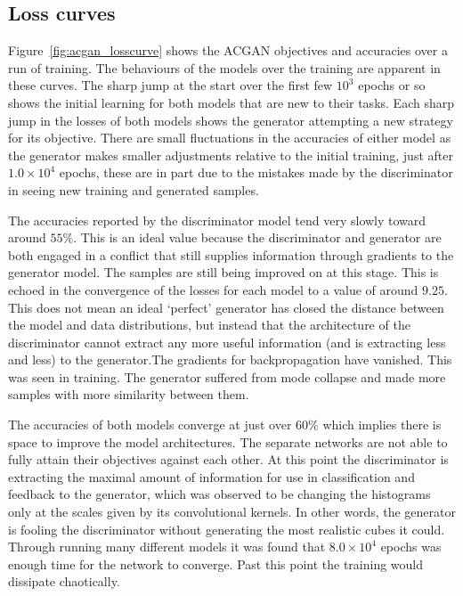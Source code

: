 \documentclass[twocolumn]{article}
\numberwithin{equation}{section}
\begin{document}
\subsection{Loss curves}

Figure~\ref{fig:acgan_losscurve} shows the ACGAN objectives and accuracies over a run of training. The behaviours of the 
models over the training are apparent in these curves. The sharp jump at the start over the first few $10^3$ epochs or so 
shows the initial learning for both models that are new to their tasks. Each sharp jump in the losses of both models shows
the  generator attempting a new strategy for its objective. There are small fluctuations in the accuracies of either model 
as the generator makes smaller adjustments relative to the initial training, just after $1.0\times10^4$ epochs, these are 
in part due to the mistakes made by the discriminator in seeing new training and generated samples.

The accuracies reported by the discriminator model tend very slowly toward around $55\%$. This is an ideal value because the
discriminator and generator are both engaged in a conflict that still supplies information through gradients to the generator
model. The samples are still being improved on at this stage. This is echoed in the convergence of the losses for each model 
to a value of around $9.25$. 
This does not mean an ideal `perfect' generator has closed the distance between the model and data distributions, but instead 
that the architecture of the discriminator cannot extract any more useful information (and is extracting less and less) to 
the generator.The gradients for backpropagation have vanished. This was seen in training. The generator suffered from mode 
collapse and made more samples with more similarity between them.

The accuracies of both models converge at just over 60\% which implies there is space to improve the model 
architectures. The separate networks are not able to fully attain their objectives against each other. At this point the 
discriminator is extracting the maximal amount of information for use in classification and feedback to the generator, 
which was observed to be changing the histograms only at the scales given by its convolutional kernels. In other words, 
the generator is fooling the discriminator without generating the most realistic cubes it could. Through running many 
different models it was found that $8.0\times 10^4$ epochs was enough time for the network to converge. Past this point 
the training would dissipate chaotically.
\end{document}
